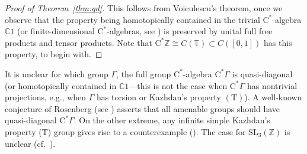 \documentclass[12pt]{amsart}
\theoremstyle{definition}
\begin{document}
\begin{proof}[Proof of Theorem~\ref{thm:qd}]
This follows from Voiculescu's theorem, once we observe that
the property being homotopically contained in the trivial {$\mathrm{C}^*$-alge\-bra\xspace} ${{\mathbb C}}1$
(or finite-dimensional $\mathrm{C}^*$-algebras, see \cite{act})
is preserved by unital full free products and tensor products.
Note that $\mathrm{C}^*{{\mathbb Z}} \cong C({{\mathbb T}})\subset C([0,1])$ has this property, to begin with.
\end{proof}

It is unclear for which group ${\Gamma}$, the full group {$\mathrm{C}^*$-alge\-bra\xspace}{} $\mathrm{C}^*{\Gamma}$ is quasi-diagonal
(or homotopically contained in ${{\mathbb C}}1$---this is not the case when $\mathrm{C}^*{\Gamma}$
has nontrivial projections, e.g., when ${\Gamma}$ has torsion or Kazhdan's property $\mathrm{(T)}$).
A well-known conjecture of Rosenberg (see \cite{cde}) asserts that all amenable groups
should have quasi-diagonal $\mathrm{C}^*{\Gamma}$.
On the other extreme, any infinite simple Kazhdan's property (T) group gives
rise to a counterexample (\cite{kirchberg:t}).
The case for $\mathrm{SL}_3({{\mathbb Z}})$ is unclear (cf.\ \cite{bekka,bekkas}).
\end{document}
